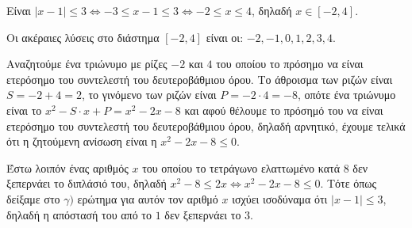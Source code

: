 
\begin{alist}
\item Είναι $|x - 1| \le 3 \Leftrightarrow -3 \le x - 1 \le 3 \Leftrightarrow -2 \le x \le 4$, δηλαδή $x \in [-2, 4]$.

\item Οι ακέραιες λύσεις στο διάστημα $[-2, 4]$ είναι οι: $-2, -1, 0, 1, 2, 3, 4$.

\item Αναζητούμε ένα τριώνυμο με ρίζες $-2$ και $4$ του οποίου το πρόσημο να είναι ετερόσημο
του συντελεστή του δευτεροβάθμιου όρου.
Το άθροισμα των ριζών είναι $S = -2 + 4 = 2$, το γινόμενο των ριζών είναι $P = -2 \cdot 4 = -8$,
οπότε ένα τριώνυμο είναι το $x^2 - S \cdot x + P = x^2 - 2x - 8$ και αφού θέλουμε το πρόσημό του
να είναι ετερόσημο του συντελεστή του δευτεροβάθμιου όρου, δηλαδή αρνητικό, έχουμε
τελικά ότι η ζητούμενη ανίσωση είναι η $x^2 - 2x - 8 \le 0$.

\item Έστω λοιπόν ένας αριθμός $x$ του οποίου το τετράγωνο ελαττωμένο κατά $8$ δεν ξεπερνάει
το διπλάσιό του, δηλαδή $x^2 - 8 \le 2x \Leftrightarrow x^2 - 2x - 8 \le 0$. Τότε όπως δείξαμε στο $\gamma)$ ερώτημα
για αυτόν τον αριθμό $x$ ισχύει ισοδύναμα ότι $|x - 1| \le 3$, δηλαδή η απόστασή του από το
$1$ δεν ξεπερνάει το $3$.
\end{alist}

